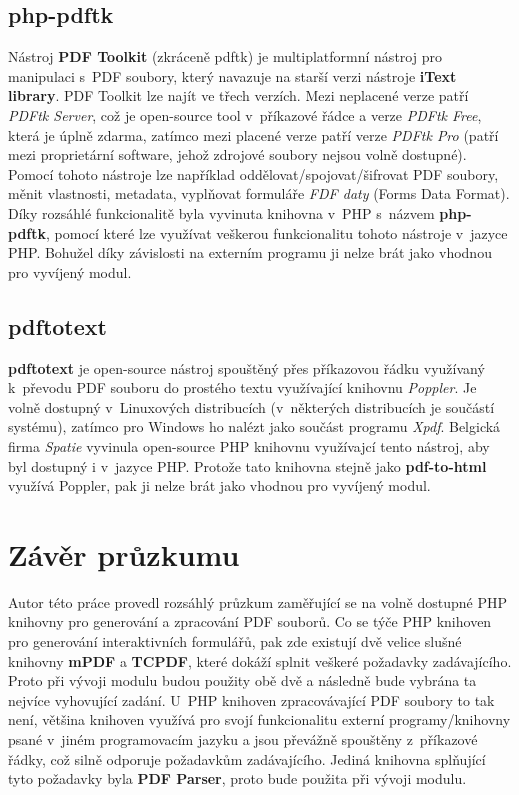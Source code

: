 \subsection{php-pdftk}
Nástroj \textbf{PDF Toolkit} (zkráceně pdftk) je multiplatformní nástroj pro manipulaci s~PDF soubory, který navazuje na starší verzi nástroje \textbf{iText library}. PDF Toolkit lze najít ve třech verzích. Mezi neplacené verze patří \textit{PDFtk Server}, což je open-source tool v~příkazové řádce a verze \textit{PDFtk Free}, která je úplně zdarma, zatímco mezi placené verze patří verze \textit{PDFtk Pro} (patří mezi proprietární software, jehož zdrojové soubory nejsou volně dostupné). Pomocí tohoto nástroje lze například oddělovat/spojovat/šifrovat PDF soubory, měnit vlastnosti, metadata, vyplňovat formuláře \textit{FDF daty} (Forms Data Format). Díky rozsáhlé funkcionalitě byla vyvinuta knihovna v~PHP s~názvem \textbf{php-pdftk}, pomocí které lze využívat veškerou funkcionalitu tohoto nástroje v~jazyce PHP. Bohužel díky závislosti na externím programu ji nelze brát jako vhodnou pro vyvíjený modul.
\subsection{pdftotext}
\textbf{pdftotext} je open-source nástroj spouštěný přes příkazovou řádku využívaný k~převodu PDF souboru do prostého textu využívající knihovnu \textit{Poppler}. Je volně dostupný v~Linuxových distribucích (v~některých distribucích je součástí systému), zatímco pro Windows ho nalézt jako součást programu \textit{Xpdf}. Belgická firma \textit{Spatie} vyvinula open-source PHP knihovnu využívajcí tento nástroj, aby byl dostupný i v~jazyce PHP. Protože tato knihovna stejně jako \textbf{pdf-to-html} využívá Poppler, pak ji nelze brát jako vhodnou pro vyvíjený modul.
\section{Závěr průzkumu}
Autor této práce provedl rozsáhlý průzkum zaměřující se na volně dostupné PHP knihovny pro generování a zpracování PDF souborů. Co se týče PHP knihoven pro generování interaktivních formulářů, pak zde existují  dvě velice slušné knihovny \textbf{mPDF} a \textbf{TCPDF}, které dokáží  splnit veškeré požadavky zadávajícího. Proto při vývoji modulu budou použity obě dvě a následně bude vybrána ta nejvíce vyhovující zadání. U~PHP knihoven zpracovávající PDF soubory to tak není, většina knihoven využívá pro svojí funkcionalitu externí programy/knihovny psané v~jiném programovacím jazyku a jsou převážně spouštěny z~příkazové řádky, což silně odporuje požadavkům zadávajícího. Jediná knihovna splňující tyto požadavky byla \textbf{PDF Parser}, proto bude použita při vývoji modulu. 